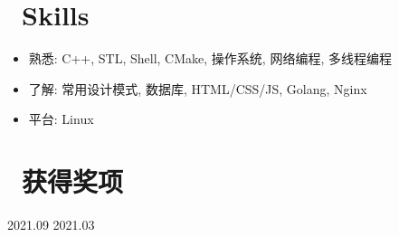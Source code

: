 \documentclass{resume}
\begin{document}


\section{\faCogs\ Skills}
\begin{itemize}[parsep=0.5ex]
  \item 熟悉: C++, STL, Shell, CMake, 操作系统, 网络编程, 多线程编程
  \item 了解: 常用设计模式, 数据库, HTML/CSS/JS, Golang, Nginx
  \item 平台: Linux
\end{itemize}

\section{\faHeartO\ 获得奖项}
 {2021.09}
 {2021.03}


%
%
\end{document}
